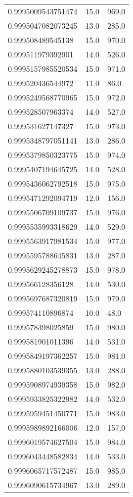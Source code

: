 \begin{center}
\begin{supertabular}[H]{p{0.30\textwidth}p{0.05\textwidth}p{0.05\textwidth}}
0.9995009543751474 & 15.0 & 969.0 \\ 
0.9995047082073245 & 13.0 & 285.0 \\ 
0.999508489545138 & 15.0 & 970.0 \\ 
0.999511979392901 & 14.0 & 526.0 \\ 
0.9995157985520534 & 15.0 & 971.0 \\ 
0.999520436544972 & 11.0 & 86.0 \\ 
0.9995249568770965 & 15.0 & 972.0 \\ 
0.999528507963374 & 14.0 & 527.0 \\ 
0.999531627147327 & 15.0 & 973.0 \\ 
0.9995348797051141 & 13.0 & 286.0 \\ 
0.9995379850323775 & 15.0 & 974.0 \\ 
0.9995407194645725 & 14.0 & 528.0 \\ 
0.9995436062792518 & 15.0 & 975.0 \\ 
0.9995471292094719 & 12.0 & 156.0 \\ 
0.9995506709109737 & 15.0 & 976.0 \\ 
0.9995535993318629 & 14.0 & 529.0 \\ 
0.9995563917981534 & 15.0 & 977.0 \\ 
0.9995595788645831 & 13.0 & 287.0 \\ 
0.9995629245278873 & 15.0 & 978.0 \\ 
0.999566128356128 & 14.0 & 530.0 \\ 
0.9995697687320819 & 15.0 & 979.0 \\ 
0.999574110896874 & 10.0 & 48.0 \\ 
0.999578398025859 & 15.0 & 980.0 \\ 
0.999581901011396 & 14.0 & 531.0 \\ 
0.9995849197362257 & 15.0 & 981.0 \\ 
0.9995880103539355 & 13.0 & 288.0 \\ 
0.9995908974939358 & 15.0 & 982.0 \\ 
0.9995933825322982 & 14.0 & 532.0 \\ 
0.9995959451450771 & 15.0 & 983.0 \\ 
0.9995989892166006 & 12.0 & 157.0 \\ 
0.9996019574627504 & 15.0 & 984.0 \\ 
0.9996043448582834 & 14.0 & 533.0 \\ 
0.9996065717572487 & 15.0 & 985.0 \\ 
0.9996090615734967 & 13.0 & 289.0 \\ 

\end{supertabular}
\end{center}
